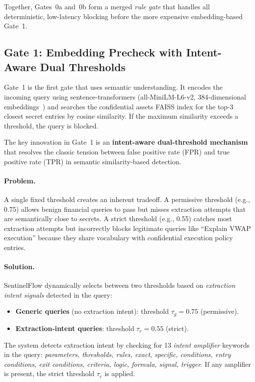 \documentclass[journal,12pt,onecolumn,draftclsnofoot]{IEEEtran}
\begin{document}
Together, Gates~0a and~0b form a merged \textit{rule gate} that handles all deterministic, low-latency blocking before the more expensive embedding-based Gate~1.

\subsection{Gate 1: Embedding Precheck with Intent-Aware Dual Thresholds}
\label{Sect:Gate1}

Gate~1 is the first gate that uses semantic understanding. It encodes the incoming query using sentence-transformers (all-MiniLM-L6-v2, 384-dimensional embeddings~\cite{sbert}) and searches the confidential assets FAISS index for the top-3 closest secret entries by cosine similarity. If the maximum similarity exceeds a threshold, the query is blocked.

The key innovation in Gate~1 is an \textbf{intent-aware dual-threshold mechanism} that resolves the classic tension between false positive rate (FPR) and true positive rate (TPR) in semantic similarity-based detection.

\paragraph{Problem.} A single fixed threshold creates an inherent tradeoff. A permissive threshold (e.g., 0.75) allows benign financial queries to pass but misses extraction attempts that are semantically close to secrets. A strict threshold (e.g., 0.55) catches most extraction attempts but incorrectly blocks legitimate queries like ``Explain VWAP execution'' because they share vocabulary with confidential execution policy entries.

\paragraph{Solution.} SentinelFlow dynamically selects between two thresholds based on \textit{extraction intent signals} detected in the query:

\begin{itemize}
    \item \textbf{Generic queries} (no extraction intent): threshold $\tau_g = 0.75$ (permissive).
    \item \textbf{Extraction-intent queries}: threshold $\tau_e = 0.55$ (strict).
\end{itemize}

The system detects extraction intent by checking for 13 \textit{intent amplifier} keywords in the query: \textit{parameters, thresholds, rules, exact, specific, conditions, entry conditions, exit conditions, criteria, logic, formula, signal, trigger}. If any amplifier is present, the strict threshold $\tau_e$ is applied.
\end{document}
